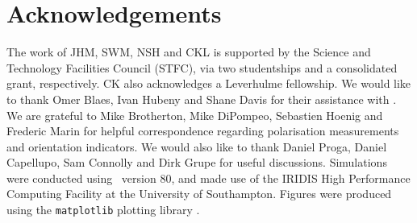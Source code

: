 \documentclass[useAMS,usenatbib]{mn2e_x}
\begin{document}






\section*{Acknowledgements}

The work of JHM, SWM, NSH and CKL is supported by the
Science and Technology Facilities Council (STFC),
via two studentships and a consolidated grant, respectively.
CK also acknowledges a Leverhulme fellowship.
We would like to thank Omer Blaes, Ivan Hubeny and Shane Davis for their
assistance with \agn. We are grateful to Mike Brotherton, Mike DiPompeo,
Sebastien Hoenig and Frederic Marin for helpful correspondence regarding
polarisation measurements and orientation indicators.
We would also like to thank Daniel Proga, Daniel Capellupo, Sam Connolly and
Dirk Grupe for useful discussions.  Simulations were conducted using \py\ version 80,
and made use of the IRIDIS High Performance Computing Facility at the
University of Southampton. Figures were produced using the {\tt matplotlib} plotting library
\citep{matplotlib}.




\clearpage
\clearpage
\end{document}
